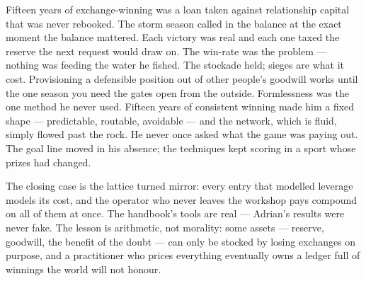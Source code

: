 \begin{lattice}
   Fifteen years of exchange-winning was a loan taken against relationship capital that was never rebooked. The storm season called in the balance at the exact moment the balance mattered.
   Each victory was real and each one taxed the reserve the next request would draw on. The win-rate was the problem --- nothing was feeding the water he fished.
   The stockade held; sieges are what it cost. Provisioning a defensible position out of other people's goodwill works until the one season you need the gates open from the outside.
   Formlessness was the one method he never used. Fifteen years of consistent winning made him a fixed shape --- predictable, routable, avoidable --- and the network, which is fluid, simply flowed past the rock.
   He never once asked what the game was paying out. The goal line moved in his absence; the techniques kept scoring in a sport whose prizes had changed.
\end{lattice}

\begin{lesson}
The closing case is the lattice turned mirror: every entry that modelled leverage models its cost, and the operator who never leaves the workshop pays compound on all of them at once. The handbook's tools are real --- Adrian's results were never fake. The lesson is arithmetic, not morality: some assets --- reserve, goodwill, the benefit of the doubt --- can only be stocked by losing exchanges on purpose, and a practitioner who prices everything eventually owns a ledger full of winnings the world will not honour.
\end{lesson}
